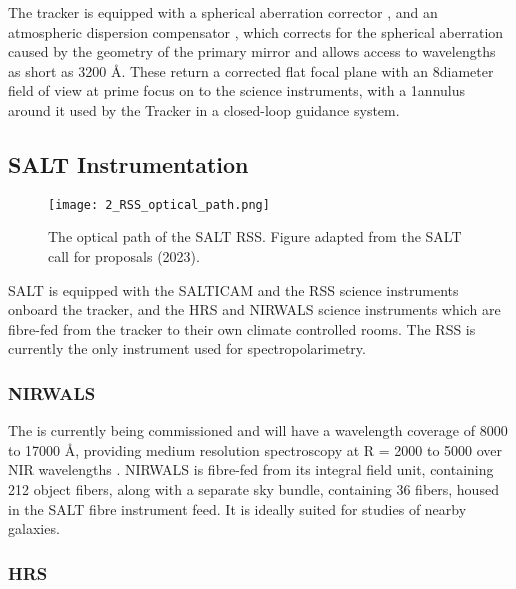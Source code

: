 
The tracker is equipped with a spherical aberration corrector \citep{SALT_SAC}, and an atmospheric dispersion compensator \citep{SALT_ADC}, which corrects for the spherical aberration caused by the geometry of the primary mirror and allows access to wavelengths as short as 3200 \AA. These return a corrected flat focal plane with an 8\arcmin diameter field of view at prime focus on to the science instruments, with a 1\arcmin annulus around it used by the Tracker in a closed-loop guidance system.


\subsection{SALT Instrumentation} \label{subsec:SALT_instr}

\begin{figure}[t]
    \centering
    \texttt{[image: 2\_RSS\_optical\_path.png]}
    \caption{The optical path of the \gls{SALT} \gls{RSS}. Figure adapted from the SALT call for proposals (2023).\protect\footnotemark}
    \label{fig:RSS_layout}
\end{figure}

SALT is equipped with the \gls{SALTICAM} and the \gls{RSS} science instruments onboard the tracker, and the \gls{HRS} and \gls{NIRWALS} science instruments which are fibre-fed from the tracker to their own climate controlled rooms. The \gls{RSS} is currently the only instrument used for spectropolarimetry.

\subsubsection{\gls{NIRWALS}}

The  is currently being commissioned and will have a wavelength coverage of 8000 to 17000 \AA, providing medium resolution spectroscopy at R = 2000 to 5000 over \gls{NIR} wavelengths \citep{NIRWALS, SALT_NIRWALS}. \gls{NIRWALS} is fibre-fed from its integral field unit, containing 212 object fibers, along with a separate sky bundle, containing 36 fibers, housed in the \gls{SALT} fibre instrument feed. It is ideally suited for studies of nearby galaxies.

\subsubsection{\gls{HRS}}

